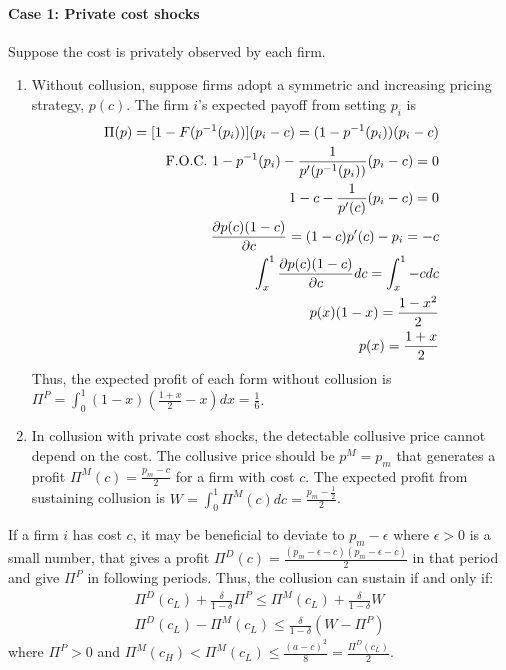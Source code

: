 \documentclass[12pt]{article}
\begin{document}
\paragraph{Case 1: Private cost shocks}
Suppose the cost is privately observed by each firm.
\begin{enumerate}
    \item Without collusion, suppose firms adopt a symmetric and increasing pricing strategy, $p(c)$. The firm $i$'s expected payoff from setting $p_i$ is
    \begin{equation}
        \begin{aligned}
            \Pi(p)=[1-F(p^{-1}(p_i))](p_i-c)=(1-p^{-1}(p_i))(p_i-c)\\
            \textnormal{F.O.C. }1-p^{-1}(p_i)-\frac{1}{p'(p^{-1}(p_i))}(p_i-c)=0\\
            1-c-\frac{1}{p'(c)}(p_i-c)=0\\
            \frac{\partial p(c)(1-c)}{\partial c}=(1-c)p'(c)-p_i=-c\\
            \int_{x}^{1}\frac{\partial p(c)(1-c)}{\partial c}dc=\int_{x}^{1}-cdc\\
            p(x)(1-x)=\frac{1-x^2}{2}\\
            p(x)=\frac{1+x}{2}
        \end{aligned}
        \nonumber
    \end{equation}
    Thus, the expected profit of each form without collusion is $\Pi^P=\int_0^1 (1-x)(\frac{1+x}{2}-x)dx=\frac{1}{6}$.
    \item In collusion with private cost shocks, the detectable collusive price cannot depend on the cost. The collusive price should be $p^M=p_m$ that generates a profit $\Pi^M(c)=\frac{p_m-c}{2}$ for a firm with cost $c$. The expected profit from sustaining collusion is $W=\int_0^1 \Pi^M(c)dc=\frac{p_m-\frac{1}{2}}{2}$.
\end{enumerate}

If a firm $i$ has cost $c$, it may be beneficial to deviate to $p_m-\epsilon$ where $\epsilon>0$ is a small number, that gives a profit $\Pi^D(c)=\frac{(p_m-\epsilon-c)(p_m-\epsilon-c)}{2}$ in that period and give $\Pi^P$ in following periods. Thus, the collusion can sustain if and only if:
\begin{equation}
    \begin{aligned}
        \Pi^D(c_L)+\frac{\delta}{1-\delta}\Pi^P\leq \Pi^M(c_L)+\frac{\delta}{1-\delta}W\\
        \Pi^D(c_L)-\Pi^M(c_L)\leq \frac{\delta}{1-\delta}(W-\Pi^P)
        \end{aligned}
        \nonumber
\end{equation}
where $\Pi^P>0$ and $\Pi^M(c_H)<\Pi^M(c_L)\leq\frac{(a-c)^2}{8}=\frac{\Pi^D(c_L)}{2}$.
\end{document}
